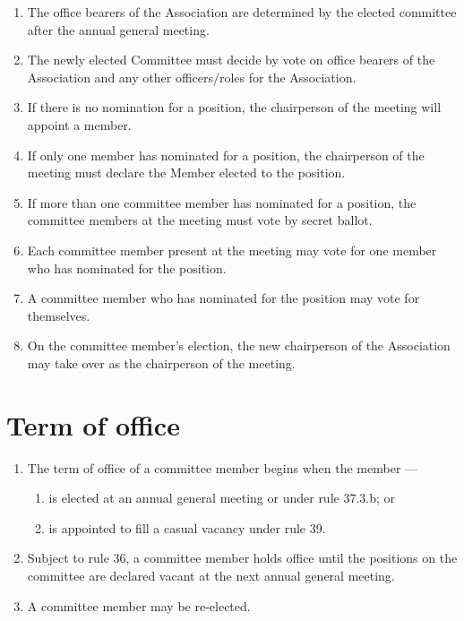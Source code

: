 \begin{enumerate}

\item The office bearers of the Association are determined by the elected committee after the annual general meeting.
\item The newly elected Committee must decide by vote on office bearers of the Association and any other officers/roles for the Association.
\item If there is no nomination for a position, the chairperson of the meeting will appoint a member.
\item If only one member has nominated for a position, the chairperson of the meeting must declare the Member elected to the position.
\item If more than one committee member has nominated for a position, the committee members at the meeting must vote by secret ballot.
\item Each committee member present at the meeting may vote for one member who has nominated for the position.
\item A committee member who has nominated for the position may vote for themselves.
\item On the committee member's election, the new chairperson of the Association may take over as the chairperson of the meeting.
\end{enumerate}

\hypertarget{term-of-office}{%
\section{Term of office}\label{term-of-office}}

\begin{enumerate}

\item The term of office of a committee member begins when the member ---

  \begin{enumerate}
  
  \item is elected at an annual general meeting or under rule 37.3.b; or
  \item is appointed to fill a casual vacancy under rule 39.
  \end{enumerate}
\item Subject to rule 36, a committee member holds office until the positions on the committee are declared vacant at the next annual general meeting.
\item A committee member may be re-elected.
\end{enumerate}

